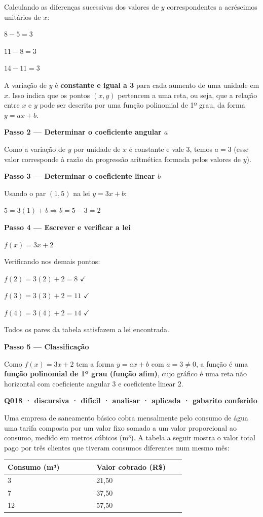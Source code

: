 \documentclass[11pt,a4paper]{article}
\begin{document}
Calculando as diferenças sucessivas dos valores de $y$ correspondentes a acréscimos unitários de $x$:

$8-5=3$

$11-8=3$

$14-11=3$

A variação de $y$ é \textbf{constante e igual a 3} para cada aumento de uma unidade em $x$. Isso indica que os pontos $(x,y)$ pertencem a uma reta, ou seja, que a relação entre $x$ e $y$ pode ser descrita por uma função polinomial de 1º grau, da forma $y = ax + b$.

\textbf{Passo 2 — Determinar o coeficiente angular $a$}

Como a variação de $y$ por unidade de $x$ é constante e vale 3, temos $a = 3$ (esse valor corresponde à razão da progressão aritmética formada pelos valores de $y$).

\textbf{Passo 3 — Determinar o coeficiente linear $b$}

Usando o par $(1,5)$ na lei $y = 3x + b$:

$5 = 3(1) + b \Rightarrow b = 5 - 3 = 2$

\textbf{Passo 4 — Escrever e verificar a lei}

$f(x) = 3x + 2$

Verificando nos demais pontos:

$f(2) = 3(2)+2 = 8$ $\checkmark$

$f(3) = 3(3)+2 = 11$ $\checkmark$

$f(4) = 3(4)+2 = 14$ $\checkmark$

Todos os pares da tabela satisfazem a lei encontrada.

\textbf{Passo 5 — Classificação}

Como $f(x) = 3x + 2$ tem a forma $y = ax + b$ com $a = 3 \neq 0$, a função é uma \textbf{função polinomial de 1º grau (função afim)}, cujo gráfico é uma reta não horizontal com coeficiente angular $3$ e coeficiente linear $2$.

\bigskip\noindent\textbf{Q018 · discursiva · difícil · analisar · aplicada · gabarito conferido}\par\nopagebreak
Uma empresa de saneamento básico cobra mensalmente pelo consumo de água uma tarifa composta por um valor fixo somado a um valor proporcional ao consumo, medido em metros cúbicos (m³). A tabela a seguir mostra o valor total pago por três clientes que tiveram consumos diferentes num mesmo mês:

\begin{center}
\begin{tabular}{|p{0.430\linewidth}|p{0.430\linewidth}|}
\hline
\textbf{Consumo (m³)} & \textbf{Valor cobrado (R\$)} \\
\hline
3 & 21,50 \\
\hline
7 & 37,50 \\
\hline
12 & 57,50 \\
\hline
\end{tabular}
\end{center}
\end{document}

